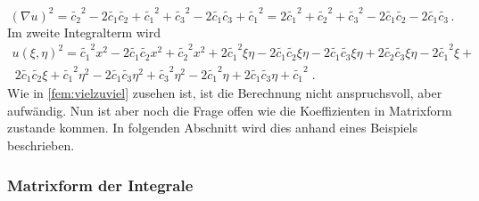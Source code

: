 \begin{equation}
	(\nabla u)^2 = \tilde{c_2}^2 - 2 \tilde{c_1} \tilde{c_2} + \tilde{c_1}^2 + \tilde{c_3}^2 -2 \tilde{c_1}\tilde{c_3} + \tilde{c_1}^2 = 2\tilde{c_1}^2 + \tilde{c_2}^2 + \tilde{c_3}^2 -2\tilde{c_1}\tilde{c_2} -2\tilde{c_1}\tilde{c_3}\, .
	\label{fem:equationSchwarzquadratischQ2}
\end{equation}
Im zweite Integralterm wird 
\begin{multline}
	u(\xi, \eta)^2 = \tilde{c_1}^2 x^2  - 2 \tilde{c_1} \tilde{c_2} x^2 + \tilde{c_2}^2 x^2 + 2 \tilde{c_1}^2 \xi \eta - 2 \tilde{c_1} \tilde{c_2} \xi \eta - 2 \tilde{c_1} \tilde{c_3} \xi \eta + 2 \tilde{c_2} \tilde{c_3} \xi \eta - 2 \tilde{c_1}^2 \xi + \\\ 2 \tilde{c_1} \tilde{c_2} \xi + \tilde{c_1}^2 \eta^2 - 2 \tilde{c_1} \tilde{c_3} \eta^2 + \tilde{c_3}^2 \eta^2 - 2 \tilde{c_1}^2 \eta + 2 \tilde{c_1} \tilde{c_3} \eta + \tilde{c_1}^2 \; .
	\label{fem:vielzuviel}
\end{multline}
Wie in \eqref{fem:vielzuviel} zusehen ist, ist die Berechnung nicht anspruchsvoll, aber aufwändig. Nun ist aber noch die Frage offen wie die Koeffizienten in Matrixform zustande kommen. In folgenden Abschnitt wird dies anhand eines Beispiels beschrieben.

\subsubsection{Matrixform der Integrale
\label{fem:section:GL}}

